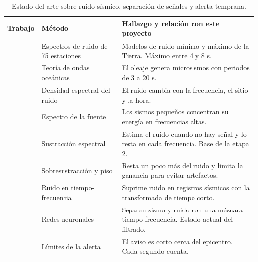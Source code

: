\documentclass[11pt,letterpaper]{article}
\begin{document}
\begin{table}[H]
\centering
\small
\begin{tabularx}{\textwidth}{>{\raggedright\arraybackslash}p{3.2cm}>{\raggedright\arraybackslash}p{3.3cm}X}
\toprule
Trabajo & Método & Hallazgo y relación con este proyecto\\
\midrule
\textcite{peterson1993} & Espectros de ruido de 75 estaciones & Modelos de ruido mínimo y máximo de la Tierra. Máximo entre 4 y 8 s.\\
\textcite{longuet1950} & Teoría de ondas oceánicas & El oleaje genera microsismos con periodos de 3 a 20 s.\\
\textcite{mcnamara2004} & Densidad espectral del ruido & El ruido cambia con la frecuencia, el sitio y la hora.\\
\textcite{brune1970} & Espectro de la fuente & Los sismos pequeños concentran su energía en frecuencias altas.\\
\textcite{boll1979} & Sustracción espectral & Estima el ruido cuando no hay señal y lo resta en cada frecuencia. Base de la etapa 2.\\
\textcite{berouti1979} & Sobresustracción y piso & Resta un poco más del ruido y limita la ganancia para evitar artefactos.\\
\textcite{mousavi2016} & Ruido en tiempo-frecuencia & Suprime ruido en registros sísmicos con la transformada de tiempo corto.\\
\textcite{zhu2019} & Redes neuronales & Separan sismo y ruido con una máscara tiempo-frecuencia. Estado actual del filtrado.\\
\textcite{minson2018} & Límites de la alerta & El aviso es corto cerca del epicentro. Cada segundo cuenta.\\
\bottomrule
\end{tabularx}
\caption{Estado del arte sobre ruido sísmico, separación de señales y alerta temprana.}
\label{tab:arte}
\end{table}
\end{document}
